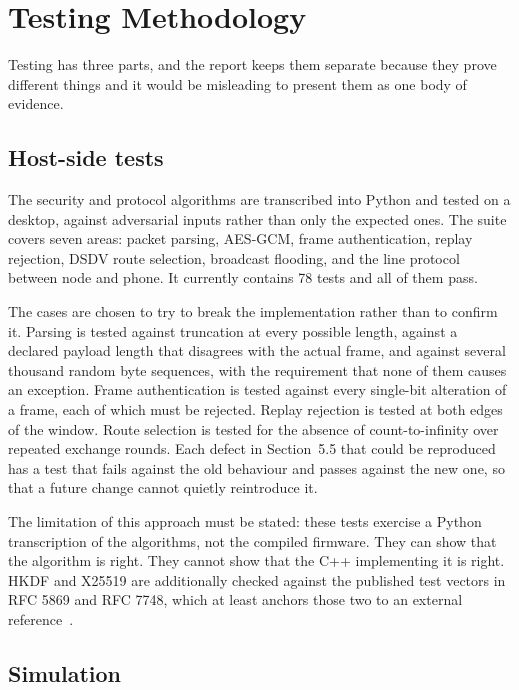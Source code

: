 \documentclass[12pt,a4paper,oneside]{report}
\begin{document}
\chapter{Testing Methodology}

Testing has three parts, and the report keeps them separate because they prove
different things and it would be misleading to present them as one body of
evidence.

\section{Host-side tests}

The security and protocol algorithms are transcribed into Python and tested on a
desktop, against adversarial inputs rather than only the expected ones. The suite
covers seven areas: packet parsing, AES-GCM, frame authentication, replay
rejection, DSDV route selection, broadcast flooding, and the line protocol
between node and phone. It currently contains 78 tests and all of them pass.

The cases are chosen to try to break the implementation rather than to confirm
it. Parsing is tested against truncation at every possible length, against a
declared payload length that disagrees with the actual frame, and against several
thousand random byte sequences, with the requirement that none of them causes an
exception. Frame authentication is tested against every single-bit alteration of
a frame, each of which must be rejected. Replay rejection is tested at both edges
of the window. Route selection is tested for the absence of count-to-infinity
over repeated exchange rounds. Each defect in Section~5.5 that could be
reproduced has a test that fails against the old behaviour and passes against the
new one, so that a future change cannot quietly reintroduce it.

The limitation of this approach must be stated: these tests exercise a Python
transcription of the algorithms, not the compiled firmware. They can show that
the algorithm is right. They cannot show that the C++ implementing it is right.
HKDF and X25519 are additionally checked against the published test vectors in
RFC 5869 and RFC 7748, which at least anchors those two to an external
reference~\cite{rfc5869,rfc7748}.

\section{Simulation}
\end{document}
